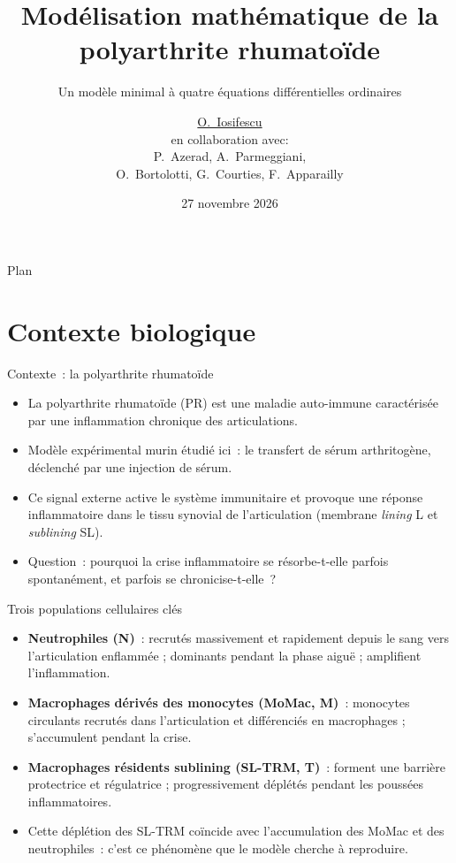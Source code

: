 \documentclass[aspectratio=169,12pt]{beamer}
\title[Modèle mathématique de l'arthrite]{Modélisation mathématique de la polyarthrite rhumatoïde}
\subtitle{Un modèle minimal à quatre équations différentielles ordinaires}
\author{\underline{O.~Iosifescu}\\
\rm{en collaboration avec}: \\
P.~Azerad,  A.~Parmeggiani, \\
O.~Bortolotti, G.~Courties, F.~Apparailly
}
\institute[IMAG -- IRMB -- L2C]{
IMAG, UMR5149, Université de Montpellier \\
L2C, UMR5221, Université de Montpellier \\
IRMB, UMR1183, Université de Montpellier, INSERM
}
\date{27 novembre 2026}
\begin{document}
\begin{frame}
\titlepage
\end{frame}

\begin{frame}{Plan}
\tableofcontents
\end{frame}

\section{Contexte biologique}

\begin{frame}{Contexte~: la polyarthrite rhumatoïde}
\begin{itemize}
\item La polyarthrite rhumatoïde (PR) est une maladie auto-immune caractérisée par une inflammation chronique des articulations.
\item Modèle expérimental murin étudié ici~: le \alert{transfert de sérum arthritogène}, déclenché par une injection de sérum.
\item Ce signal externe active le système immunitaire et provoque une réponse inflammatoire dans le tissu synovial de l'articulation (membrane \emph{lining} L et \emph{sublining} SL).
\item Question~: pourquoi la crise inflammatoire se résorbe-t-elle parfois spontanément, et parfois se chronicise-t-elle~?
\end{itemize}
\end{frame}

\begin{frame}{Trois populations cellulaires clés}
\begin{itemize}
\item \textbf{Neutrophiles (N)}~: recrutés massivement et rapidement depuis le sang vers l'articulation enflammée ; dominants pendant la phase aiguë ; amplifient l'inflammation.
\item \textbf{Macrophages dérivés des monocytes (MoMac, M)}~: monocytes circulants recrutés dans l'articulation et différenciés en macrophages ; s'accumulent pendant la crise.
\item \textbf{Macrophages résidents sublining (SL-TRM, T)}~: forment une barrière protectrice et régulatrice ; \alert{progressivement déplétés} pendant les poussées inflammatoires.
\item Cette déplétion des SL-TRM coïncide avec l'accumulation des MoMac et des neutrophiles~: c'est ce phénomène que le modèle cherche à reproduire.
\end{itemize}
\end{frame}
\end{document}
